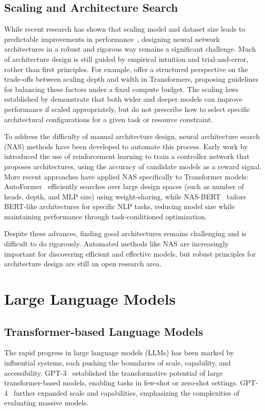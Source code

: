 \subsection{Scaling and Architecture Search}
While recent research has shown that scaling model and dataset size leads to predictable improvements in performance~\citep{kaplan2020scaling, henighan2020scaling}, designing neural network architectures in a robust and rigorous way remains a significant challenge. Much of architecture design is still guided by empirical intuition and trial-and-error, rather than first principles. For example, \citet{levine2020depth} offer a structured perspective on the trade-offs between scaling depth and width in Transformers, proposing guidelines for balancing these factors under a fixed compute budget. The scaling laws established by \citet{kaplan2020scaling} demonstrate that both wider and deeper models can improve performance if scaled appropriately, but do not prescribe how to select specific architectural configurations for a given task or resource constraint.

To address the difficulty of manual architecture design, neural architecture search (NAS) methods have been developed to automate this process. Early work by \citet{zoph2017neural} introduced the use of reinforcement learning to train a controller network that proposes architectures, using the accuracy of candidate models as a reward signal. More recent approaches have applied NAS specifically to Transformer models: AutoFormer~\citep{chen2021autoformer} efficiently searches over large design spaces (such as number of heads, depth, and MLP size) using weight-sharing, while NAS-BERT~\citep{xu2021nasbert} tailors BERT-like architectures for specific NLP tasks, reducing model size while maintaining performance through task-conditioned optimization.

Despite these advances, finding good architectures remains challenging and is difficult to do rigorously. Automated methods like NAS are increasingly important for discovering efficient and effective models, but robust principles for architecture design are still an open research area.

\section{Large Language Models}

\subsection{Transformer-based Language Models}
The rapid progress in large language models (LLMs) has been marked by influential systems, each pushing the boundaries of scale, capability, and accessibility. GPT-3~\citep{brown2020gpt3} established the transformative potential of large transformer-based models, enabling tasks in few-shot or zero-shot settings. GPT-4~\citep{openai2023gpt4} further expanded scale and capabilities, emphasizing the complexities of evaluating massive models.

